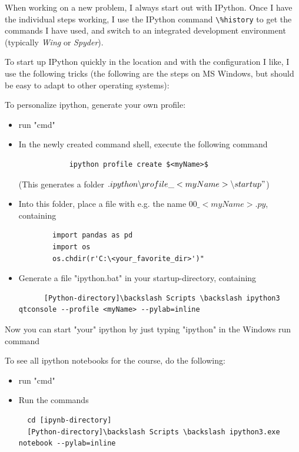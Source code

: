 When working on a new problem, I always start out with IPython. Once I have the individual steps working, I use the IPython command \lstinline{\%history} to get the commands I have used, and switch to an integrated development environment (typically \emph{Wing} or \emph{Spyder}).

To start up IPython quickly in the location and with the configuration I like, I use the following tricks (the following are the steps on MS Windows, but should be easy to adapt to other operating systems):

To personalize ipython, generate your own profile:

\begin{itemize}
  \item run "cmd"
  
  \item In the newly created command shell, execute the following command
        \begin{lstlisting}
            ipython profile create $<myName>$
        \end{lstlisting}
        (This generates a folder $.ipython \backslash profile\_<myName> \backslash startup"$)
  \item Into this folder, place a file with e.g. the name $00\_<myName>.py$, containing
        \begin{lstlisting}
        import pandas as pd
        import os
        os.chdir(r'C:\<your_favorite_dir>')"
        \end{lstlisting}            
  \item Generate a file "ipython.bat" in your startup-directory, containing
      \begin{lstlisting}
      [Python-directory]\backslash Scripts \backslash ipython3 qtconsole --profile <myName> --pylab=inline
      \end{lstlisting}            
\end{itemize}
    
Now you can start "your" ipython by just typing "ipython" in the Windows run command

To see all ipython notebooks for the course, do the following:
\begin{itemize}
  \item run "cmd"
  \item Run the commands
  \begin{lstlisting}
  cd [ipynb-directory]
  [Python-directory]\backslash Scripts \backslash ipython3.exe notebook --pylab=inline
  \end{lstlisting}
\end{itemize}
        
